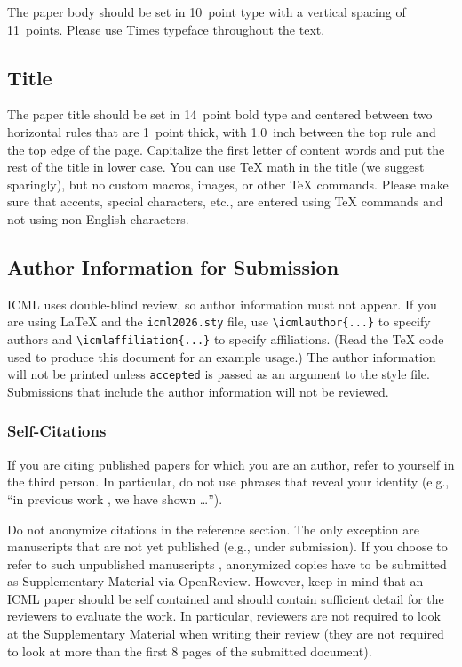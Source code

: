 \documentclass{article}
\theoremstyle{plain}
\theoremstyle{definition}
\theoremstyle{remark}
\begin{document}
The paper body should be set in 10~point type with a vertical spacing
of 11~points. Please use Times typeface throughout the text.

\subsection{Title}

The paper title should be set in 14~point bold type and centered
between two horizontal rules that are 1~point thick, with 1.0~inch
between the top rule and the top edge of the page. Capitalize the
first letter of content words and put the rest of the title in lower
case.
You can use TeX math in the title (we suggest sparingly),
but no custom macros, images, or other TeX commands.
Please make sure that accents, special characters, etc., are entered using
TeX commands and not using non-English characters.

\subsection{Author Information for Submission}
\label{author info}

ICML uses double-blind review, so author information must not appear. If
you are using \LaTeX\/ and the \texttt{icml2026.sty} file, use
\verb+\icmlauthor{...}+ to specify authors and \verb+\icmlaffiliation{...}+
to specify affiliations. (Read the TeX code used to produce this document for
an example usage.) The author information will not be printed unless
\texttt{accepted} is passed as an argument to the style file. Submissions that
include the author information will not be reviewed.

\subsubsection{Self-Citations}

If you are citing published papers for which you are an author, refer
to yourself in the third person. In particular, do not use phrases
that reveal your identity (e.g., ``in previous work \cite{langley00}, we
have shown \ldots'').

Do not anonymize citations in the reference section. The only exception are manuscripts that are
not yet published (e.g., under submission). If you choose to refer to
such unpublished manuscripts \cite{anonymous}, anonymized copies have
to be submitted
as Supplementary Material via OpenReview\@. However, keep in mind that an ICML
paper should be self contained and should contain sufficient detail
for the reviewers to evaluate the work. In particular, reviewers are
not required to look at the Supplementary Material when writing their
review (they are not required to look at more than the first $8$ pages of the submitted document).
\end{document}
